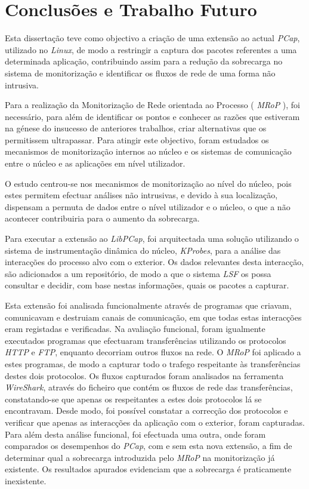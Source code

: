 \chapter{Conclusões e Trabalho Futuro}
\label{cap:conclusao}

Esta dissertação teve como objectivo a criação de uma extensão ao actual \textit{PCap}, utilizado no \textit{Linux}, de modo a restringir a captura dos pacotes referentes a uma determinada aplicação, contribuindo assim para a redução da sobrecarga no sistema de monitorização e identificar os fluxos de rede de uma forma não intrusiva.

Para a realização da Monitorização de Rede orientada ao Processo ( \textit{MRoP} ), foi necessário, para além de identificar os pontos e conhecer as razões que estiveram na génese do insucesso de anteriores trabalhos, criar alternativas que os permitissem ultrapassar.
Para atingir este objectivo, foram estudados os mecanismos de monitorização internos ao núcleo e os sistemas de comunicação entre o núcleo e as aplicações em nível utilizador.

O estudo centrou-se nos mecanismos de monitorização ao nível do núcleo, pois estes permitem efectuar análises não intrusivas, e devido à sua localização, dispensam a permuta de dados entre o nível utilizador e o núcleo, o que a não acontecer contribuiria para o aumento da sobrecarga.

Para executar a extensão ao \textit{LibPCap}, foi arquitectada uma solução utilizando o sistema de instrumentação dinâmica do núcleo, \textit{KProbes}, para a análise das interacções do processo alvo com o exterior.
Os dados relevantes desta interacção, são adicionados a um repositório, de modo a que o sistema \textit{LSF} os possa consultar e decidir, com base nestas informações, quais os pacotes a capturar.

Esta extensão foi analisada funcionalmente através de programas que criavam, comunicavam e destruiam canais de comunicação, em que todas estas interacções eram registadas e verificadas.
Na avaliação funcional, foram igualmente executados programas que efectuaram transferências utilizando os protocolos \textit{HTTP} e \textit{FTP}, enquanto decorriam outros fluxos na rede. 
O \textit{MRoP} foi aplicado a estes programas, de modo a capturar todo o trafego respeitante às transferências destes dois protocolos.
Os fluxos capturados foram analisados na ferramenta \textit{WireShark}, através do ficheiro que contém os fluxos de rede das transferências, constatando-se que apenas os respeitantes a estes dois protocolos lá se encontravam.
Desde modo, foi possível constatar a correcção dos protocolos e verificar que apenas as interacções da aplicação com o exterior, foram capturadas.
Para além desta análise funcional, foi efectuada uma outra, onde foram comparados os desempenhos do \textit{PCap}, com e sem esta nova extensão, a fim de determinar qual a sobrecarga introduzida pelo \textit{MRoP} na monitorização já existente.
Os resultados apurados evidenciam que a sobrecarga é praticamente inexistente.


